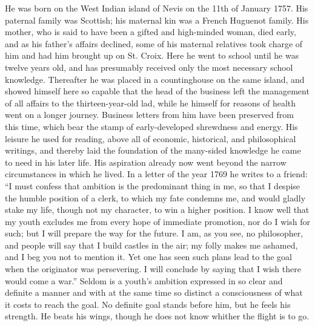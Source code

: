 \documentclass[12pt,a4paper,openany]{book}
\newcommand{\opage}[1]{\marginnote{\footnotesize\textit{[#1]}}}
\begin{document}
He was born on the West Indian island of Nevis on the 11th of January
1757. His paternal family was Scottish; his maternal kin
was a French Huguenot family. His mother, who is said to have
been a gifted and high-minded woman, died early, and as
his father's affairs declined, some of his
maternal relatives took charge of him and had him brought up
on St. Croix. Here he went to school until he was twelve years old,
and has presumably received only the most necessary school knowledge.
Thereafter he was placed in a countinghouse on the same
island, and showed himself here so capable that the head of the business
\opage{125}left the management of all affairs to the thirteen-year-old lad, while
he himself for reasons of health went on a longer journey. Business letters
from him have been preserved from this time, which
bear the stamp of early-developed shrewdness and energy. His
leisure he used for reading, above all of economic,
historical, and philosophical writings, and thereby laid the foundation
of the many-sided knowledge he came to need in his later
life. His aspiration already now went beyond the narrow
circumstances in which he lived. In a letter of the year 1769 he writes
to a friend: ``I must confess that ambition is the
predominant thing in me, so that I despise the humble position of a clerk,
to which my fate condemns me, and would gladly
stake my life, though not my character, to win a higher position.
I know well that my youth
excludes me from every hope of immediate promotion,
nor do I wish for such; but I will prepare the way for
the future. I am, as you see, no philosopher, and people
will say that I build castles in the air; my folly makes
me ashamed, and I beg you not to mention
it. Yet one has seen such plans lead to the goal when
the originator was persevering. I will conclude by saying
that I wish there would come a war.'' Seldom is
a youth's ambition expressed in so clear and definite a manner
and with at the same time so distinct a consciousness of what it costs
to reach the goal. No definite goal stands before him, but he
feels his strength. He beats his wings, though he does not
know whither the flight is to go.
\end{document}
